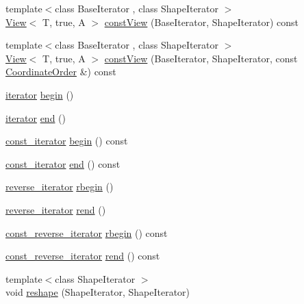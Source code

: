 \begin{DoxyCompactItemize}
\item 
{\footnotesize template$<$class Base\+Iterator , class Shape\+Iterator $>$ }\\\hyperlink{classandres_1_1View}{View}$<$ T, true, A $>$ \hyperlink{classandres_1_1View_ab329255f0d1c9f7acaa4460482ca1fe1}{const\+View} (Base\+Iterator, Shape\+Iterator) const 
\item 
{\footnotesize template$<$class Base\+Iterator , class Shape\+Iterator $>$ }\\\hyperlink{classandres_1_1View}{View}$<$ T, true, A $>$ \hyperlink{classandres_1_1View_ab3bfeed6e84bccb0669497f64eb88557}{const\+View} (Base\+Iterator, Shape\+Iterator, const \hyperlink{namespaceandres_a2ac8b7aa89d44e8188a7c0ba50f4306b}{Coordinate\+Order} \&) const 
\item 
\hyperlink{classandres_1_1View_aef54ee0a58e755b897398493d05a44df}{iterator} \hyperlink{classandres_1_1View_acd1f71e27ea01d536e1539877afedfa9}{begin} ()
\item 
\hyperlink{classandres_1_1View_aef54ee0a58e755b897398493d05a44df}{iterator} \hyperlink{classandres_1_1View_af778a1e9839f2f90e503514e36d41b78}{end} ()
\item 
\hyperlink{classandres_1_1View_a7b6f125a7b3830f30cd34887b61858a7}{const\+\_\+iterator} \hyperlink{classandres_1_1View_a95eb85a97d6a98b3cd3271a033ddae06}{begin} () const 
\item 
\hyperlink{classandres_1_1View_a7b6f125a7b3830f30cd34887b61858a7}{const\+\_\+iterator} \hyperlink{classandres_1_1View_ae55b54c50dd58caf8c128c7ec72be8c3}{end} () const 
\item 
\hyperlink{classandres_1_1View_aab07af42756759420211d114bb705547}{reverse\+\_\+iterator} \hyperlink{classandres_1_1View_a035fa9d7c83683bfbfb9141251336ba5}{rbegin} ()
\item 
\hyperlink{classandres_1_1View_aab07af42756759420211d114bb705547}{reverse\+\_\+iterator} \hyperlink{classandres_1_1View_a27d6bad469c2e4590e0fa9f00108c36e}{rend} ()
\item 
\hyperlink{classandres_1_1View_a61656971b73a48c8bf009e3200aad900}{const\+\_\+reverse\+\_\+iterator} \hyperlink{classandres_1_1View_a7c2f923cffa4782f5d14c48d54981f46}{rbegin} () const 
\item 
\hyperlink{classandres_1_1View_a61656971b73a48c8bf009e3200aad900}{const\+\_\+reverse\+\_\+iterator} \hyperlink{classandres_1_1View_a04e6fd865daf11473573114adf296662}{rend} () const 
\item 
{\footnotesize template$<$class Shape\+Iterator $>$ }\\void \hyperlink{classandres_1_1View_a7d0432d097b8ce03a413006ec2fe9469}{reshape} (Shape\+Iterator, Shape\+Iterator)

\end{DoxyCompactItemize}
